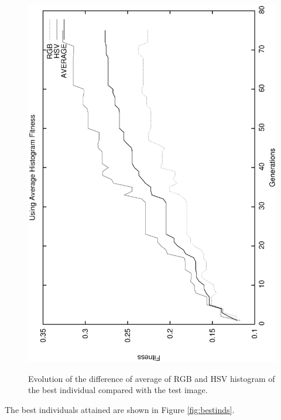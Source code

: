 \documentclass[conference]{IEEEtran}
\begin{document}
\begin{figure}
   \includegraphics[angle=-90,scale =0.35] {images/averagegens.eps}
\label{fig:averagegens}
\caption{Evolution of the difference of average of RGB and HSV histogram of the best individual compared with the test image. }
\end{figure}

The best individuals attained are shown in Figure \ref{fig:bestinds}.
\end{document}
